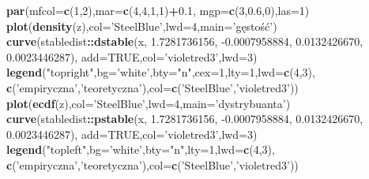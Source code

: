\documentclass[polish,]{book}
\newenvironment{Shaded}{\begin{snugshade}}{\end{snugshade}}
\newcommand{\DataTypeTok}[1]{\textcolor[rgb]{0.13,0.29,0.53}{#1}}
\newcommand{\DecValTok}[1]{\textcolor[rgb]{0.00,0.00,0.81}{#1}}
\newcommand{\FloatTok}[1]{\textcolor[rgb]{0.00,0.00,0.81}{#1}}
\newcommand{\KeywordTok}[1]{\textcolor[rgb]{0.13,0.29,0.53}{\textbf{#1}}}
\newcommand{\NormalTok}[1]{#1}
\newcommand{\OperatorTok}[1]{\textcolor[rgb]{0.81,0.36,0.00}{\textbf{#1}}}
\newcommand{\OtherTok}[1]{\textcolor[rgb]{0.56,0.35,0.01}{#1}}
\newcommand{\StringTok}[1]{\textcolor[rgb]{0.31,0.60,0.02}{#1}}
\begin{document}
\begin{Shaded}
\begin{Highlighting}[]
\KeywordTok{par}\NormalTok{(}\DataTypeTok{mfcol=}\KeywordTok{c}\NormalTok{(}\DecValTok{1}\NormalTok{,}\DecValTok{2}\NormalTok{),}\DataTypeTok{mar=}\KeywordTok{c}\NormalTok{(}\DecValTok{4}\NormalTok{,}\DecValTok{4}\NormalTok{,}\DecValTok{1}\NormalTok{,}\DecValTok{1}\NormalTok{)}\OperatorTok{+}\FloatTok{0.1}\NormalTok{, }\DataTypeTok{mgp=}\KeywordTok{c}\NormalTok{(}\DecValTok{3}\NormalTok{,}\FloatTok{0.6}\NormalTok{,}\DecValTok{0}\NormalTok{),}\DataTypeTok{las=}\DecValTok{1}\NormalTok{)}
\KeywordTok{plot}\NormalTok{(}\KeywordTok{density}\NormalTok{(z),}\DataTypeTok{col=}\StringTok{'SteelBlue'}\NormalTok{,}\DataTypeTok{lwd=}\DecValTok{4}\NormalTok{,}\DataTypeTok{main=}\StringTok{'gęstość'}\NormalTok{)}
\KeywordTok{curve}\NormalTok{(stabledist}\OperatorTok{::}\KeywordTok{dstable}\NormalTok{(x, }\FloatTok{1.7281736156}\NormalTok{, }\FloatTok{-0.0007958884}\NormalTok{, }\FloatTok{0.0132426670}\NormalTok{,  }\FloatTok{0.0023446287}\NormalTok{),}
      \DataTypeTok{add=}\OtherTok{TRUE}\NormalTok{,}\DataTypeTok{col=}\StringTok{'violetred3'}\NormalTok{,}\DataTypeTok{lwd=}\DecValTok{3}\NormalTok{)}
\KeywordTok{legend}\NormalTok{(}\StringTok{"topright"}\NormalTok{,}\DataTypeTok{bg=}\StringTok{'white'}\NormalTok{,}\DataTypeTok{bty=}\StringTok{"n"}\NormalTok{,}\DataTypeTok{cex=}\DecValTok{1}\NormalTok{,}\DataTypeTok{lty=}\DecValTok{1}\NormalTok{,}\DataTypeTok{lwd=}\KeywordTok{c}\NormalTok{(}\DecValTok{4}\NormalTok{,}\DecValTok{3}\NormalTok{),}
\KeywordTok{c}\NormalTok{(}\StringTok{'empiryczna'}\NormalTok{,}\StringTok{'teoretyczna'}\NormalTok{),}\DataTypeTok{col=}\KeywordTok{c}\NormalTok{(}\StringTok{'SteelBlue'}\NormalTok{,}\StringTok{'violetred3'}\NormalTok{))}
\KeywordTok{plot}\NormalTok{(}\KeywordTok{ecdf}\NormalTok{(z),}\DataTypeTok{col=}\StringTok{'SteelBlue'}\NormalTok{,}\DataTypeTok{lwd=}\DecValTok{4}\NormalTok{,}\DataTypeTok{main=}\StringTok{'dystrybuanta'}\NormalTok{)}
\KeywordTok{curve}\NormalTok{(stabledist}\OperatorTok{::}\KeywordTok{pstable}\NormalTok{(x, }\FloatTok{1.7281736156}\NormalTok{, }\FloatTok{-0.0007958884}\NormalTok{, }\FloatTok{0.0132426670}\NormalTok{,  }\FloatTok{0.0023446287}\NormalTok{),}
      \DataTypeTok{add=}\OtherTok{TRUE}\NormalTok{,}\DataTypeTok{col=}\StringTok{'violetred3'}\NormalTok{,}\DataTypeTok{lwd=}\DecValTok{3}\NormalTok{)}
\KeywordTok{legend}\NormalTok{(}\StringTok{"topleft"}\NormalTok{,}\DataTypeTok{bg=}\StringTok{'white'}\NormalTok{,}\DataTypeTok{bty=}\StringTok{"n"}\NormalTok{,}\DataTypeTok{lty=}\DecValTok{1}\NormalTok{,}\DataTypeTok{lwd=}\KeywordTok{c}\NormalTok{(}\DecValTok{4}\NormalTok{,}\DecValTok{3}\NormalTok{),}
\KeywordTok{c}\NormalTok{(}\StringTok{'empiryczna'}\NormalTok{,}\StringTok{'teoretyczna'}\NormalTok{),}\DataTypeTok{col=}\KeywordTok{c}\NormalTok{(}\StringTok{'SteelBlue'}\NormalTok{,}\StringTok{'violetred3'}\NormalTok{))}
\end{Highlighting}
\end{Shaded}
\end{document}
